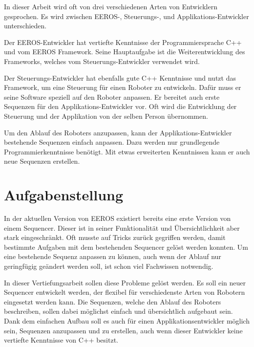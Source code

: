 In dieser Arbeit wird oft von drei verschiedenen Arten von Entwicklern gesprochen.
Es wird zwischen EEROS-, Steuerungs-, und Applikations-Entwickler unterschieden.

Der EEROS-Entwickler hat vertiefte Kenntnisse der Programmiersprache C++ und vom EEROS Framework.
Seine Hauptaufgabe ist die Weiterentwicklung des Frameworks, welches vom Steuerungs-Entwickler verwendet wird.

Der Steuerungs-Entwickler hat ebenfalls gute C++ Kenntnisse und nutzt das Framework, um eine Steuerung für einen Roboter zu entwickeln.
Dafür muss er seine Software speziell auf den Roboter anpassen.
Er bereitet auch erste Sequenzen für den Applikations-Entwickler vor.
Oft wird die Entwicklung der Steuerung und der Applikation von der selben Person übernommen.

Um den Ablauf des Roboters anzupassen, kann der Applikations-Entwickler bestehende Sequenzen einfach anpassen.
Dazu werden nur grundlegende Programmierkenntnisse benötigt.
Mit etwas erweiterten Kenntnissen kann er auch neue Sequenzen erstellen.



\section{Aufgabenstellung}
In der aktuellen Version von EEROS existiert bereits eine erste Version von einem Sequencer.
Dieser ist in seiner Funktionalität und Übersichtlichkeit aber stark eingeschränkt.
Oft musste auf Tricks zurück gegriffen werden, damit bestimmte Aufgaben mit dem bestehenden Sequencer gelöst werden konnten.
Um eine bestehende Sequenz anpassen zu können, auch wenn der Ablauf nur geringfügig geändert werden soll, ist schon viel Fachwissen notwendig.

In dieser Vertiefungsarbeit sollen diese Probleme gelöst werden.
Es soll ein neuer Sequencer entwickelt werden, der flexibel für verschiedenste Arten von Robotern eingesetzt werden kann.
Die Sequenzen, welche den Ablauf des Roboters beschreiben, sollen dabei möglichst einfach und übersichtlich aufgebaut sein.
Dank dem einfachen Aufbau soll es auch für einen Applikationsentwickler möglich sein, Sequenzen anzupassen und zu erstellen, auch wenn dieser Entwickler keine vertiefte Kenntnisse von C++ besitzt.


